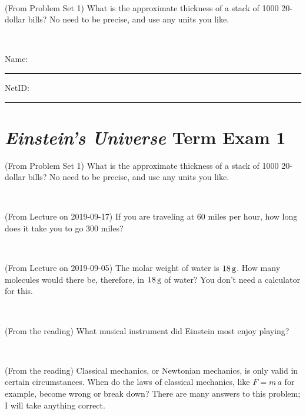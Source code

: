\documentclass[12pt, letterpaper]{article}
\begin{document}
\vfill ~

\begin{problem} (From Problem Set 1)
What is the approximate thickness of a stack of 1000 20-dollar bills?
No need to be precise, and use any units you like.
\end{problem}


\vfill ~


\cleardoublepage



\noindent
Name: \rule[-1ex]{0.60\textwidth}{0.1pt}
NetID: \rule[-1ex]{0.20\textwidth}{0.1pt}

\section*{\textsl{Einstein's Universe} Term Exam 1}
\setcounter{problem}{1}


\begin{problem} (From Problem Set 1)
What is the approximate thickness of a stack of 1000 20-dollar bills?
No need to be precise, and use any units you like.
\end{problem}


\vfill ~

\begin{problem} (From Lecture on 2019-09-17)
If you are traveling at 60 miles per hour, how long does
it take you to go 300 miles?
\end{problem}


\vfill ~

\begin{problem} (From Lecture on 2019-09-05)
The molar weight of water is $18\,\mathrm{g}$. How many molecules would there
be, therefore, in $18\,\mathrm{g}$ of water? You don't need a calculator for
this.
\end{problem}


\vfill ~

\begin{problem} (From the reading)
What musical instrument did Einstein most enjoy playing?
\end{problem}


\vfill ~


\clearpage


\begin{problem} (From the reading)
Classical mechanics, or Newtonian mechanics, is only valid in certain
circumstances. When do the laws of classical mechanics, like $F =
m\,a$ for example, become wrong or break down? There are many answers
to this problem; I will take anything correct.
\end{problem}
\end{document}
